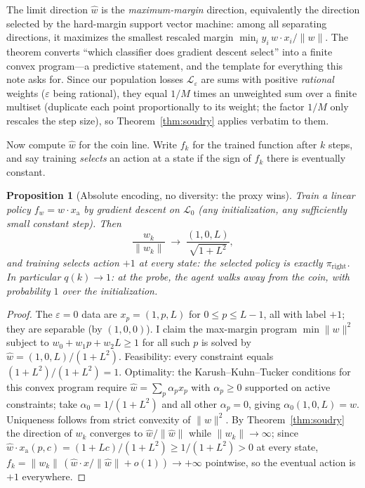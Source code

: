 \documentclass[11pt]{amsart}
\theoremstyle{plain}
\newtheorem{proposition}[theorem]{Proposition}
\theoremstyle{definition}
\begin{document}
The limit direction $\hat w$ is the \emph{maximum-margin} direction, equivalently the direction selected by the hard-margin support vector machine: among all separating directions, it maximizes the smallest rescaled margin $\min_i y_i\,w\cdot x_i/\|w\|$. The theorem converts ``which classifier does gradient descent select'' into a finite convex program---a predictive statement, and the template for everything this note asks for. Since our population losses $\mathcal L_\varepsilon$ are sums with positive \emph{rational} weights ($\varepsilon$ being rational), they equal $1/M$ times an unweighted sum over a finite multiset (duplicate each point proportionally to its weight; the factor $1/M$ only rescales the step size), so Theorem~\ref{thm:soudry} applies verbatim to them.

Now compute $\hat w$ for the coin line. Write $f_k$ for the trained function after $k$ steps, and say training \emph{selects} an action at a state if the sign of $f_k$ there is eventually constant.

\begin{proposition}[Absolute encoding, no diversity: the proxy wins]\label{prop:absolute}
Train a linear policy $f_w=w\cdot x_{\mathrm a}$ by gradient descent on $\mathcal L_0$ (any initialization, any sufficiently small constant step). Then
\[
   \frac{w_k}{\|w_k\|}\;\longrightarrow\;\frac{(1,0,L)}{\sqrt{1+L^2}},
\]
and training selects action $+1$ at \emph{every} state: the selected policy is exactly $\pi_{\mathrm{right}}$. In particular $q(k)\to1$: at the probe, the agent walks away from the coin, with probability $1$ over the initialization.
\end{proposition}

\begin{proof}
The $\varepsilon=0$ data are $x_p=(1,p,L)$ for $0\le p\le L-1$, all with label $+1$; they are separable (by $(1,0,0)$). I claim the max-margin program $\min\|w\|^2$ subject to $w_0+w_1p+w_2L\ge1$ for all such $p$ is solved by $\hat w=(1,0,L)/(1+L^2)$. Feasibility: every constraint equals $(1+L^2)/(1+L^2)=1$. Optimality: the Karush--Kuhn--Tucker conditions for this convex program require $\hat w=\sum_p\alpha_p x_p$ with $\alpha_p\ge0$ supported on active constraints; take $\alpha_0=1/(1+L^2)$ and all other $\alpha_p=0$, giving $\alpha_0(1,0,L)=\hat w$. Uniqueness follows from strict convexity of $\|w\|^2$. By Theorem~\ref{thm:soudry} the direction of $w_k$ converges to $\hat w/\|\hat w\|$ while $\|w_k\|\to\infty$; since $\hat w\cdot x_{\mathrm a}(p,c)=(1+Lc)/(1+L^2)\ge 1/(1+L^2)>0$ at every state, $f_k=\|w_k\|\,(\hat w\cdot x/\|\hat w\|+o(1))\to+\infty$ pointwise, so the eventual action is $+1$ everywhere.
\end{proof}
\end{document}
